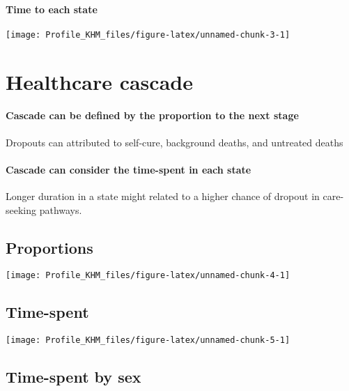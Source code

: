 \documentclass[
]{article}
\begin{document}
\hypertarget{time-to-each-state}{%
\paragraph{Time to each state}\label{time-to-each-state}}

\texttt{[image: Profile\_KHM\_files/figure-latex/unnamed-chunk-3-1]}

\hypertarget{healthcare-cascade}{%
\section{Healthcare cascade}\label{healthcare-cascade}}

\hypertarget{cascade-can-be-defined-by-the-proportion-to-the-next-stage}{%
\paragraph{Cascade can be defined by the proportion to the next
stage}\label{cascade-can-be-defined-by-the-proportion-to-the-next-stage}}

Dropouts can attributed to self-cure, background deaths, and untreated
deaths

\hypertarget{cascade-can-consider-the-time-spent-in-each-state}{%
\paragraph{Cascade can consider the time-spent in each
state}\label{cascade-can-consider-the-time-spent-in-each-state}}

Longer duration in a state might related to a higher chance of dropout
in care-seeking pathways.

\hypertarget{proportions}{%
\subsection{Proportions}\label{proportions}}

\texttt{[image: Profile\_KHM\_files/figure-latex/unnamed-chunk-4-1]}

\hypertarget{time-spent}{%
\subsection{Time-spent}\label{time-spent}}

\texttt{[image: Profile\_KHM\_files/figure-latex/unnamed-chunk-5-1]}

\hypertarget{time-spent-by-sex}{%
\subsection{Time-spent by sex}\label{time-spent-by-sex}}
\end{document}
